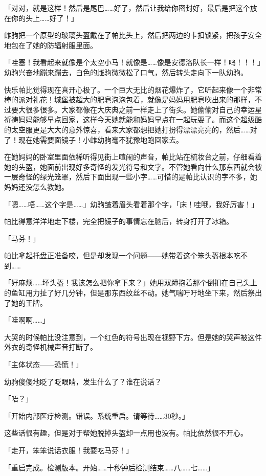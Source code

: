 「对对，就是这样！然后是尾巴……好了，然后让我给你密封好，最后是把这个放在你的头上……好了！」

雌驹把一个原型的玻璃头盔戴在了帕比头上，然后把两边的卡扣锁紧，把孩子安全地包在了她的防辐射服里面。

「哇塞！我看起来就像是个太空小马！就像是……像是安德洛队长一样！呜！！！」幼驹兴奋地蹦来蹦去，白色的雌驹微微松了口气，然后转头走向下一队幼驹。

快乐帕比觉得现在真开心极了。一个巨大无比的烟花爆炸了，它听起来像一个非常棒的派对礼花！城堡被超大的肥皂泡泡包着，就像是妈妈用肥皂吹出来的那样，不过要大很多很多。大家都像在大庆典之前一样走上了街头。她偷偷对自己的幸运星祈祷妈妈能够早点回家，这样今天她就能和妈妈早点在一起玩耍了。而这个超级酷的太空服更是大大的意外惊喜，看来大家都想把她打扮得漂漂亮亮的，然后……对了！现在她需要面镜子！小雌幼驹毫不犹豫地跑回家去。

\horizonline


在她妈妈的卧室里面依稀听得见街上喧闹的声音，帕比站在梳妆台之前，仔细看着她的头盔，她面前出现好多奇怪的发光符号和文字。不管她看向什么那东西就会被一层奇怪的绿光笼罩，然后下面出现一些小字……可惜的是帕比认识的字不多，她妈妈还没怎么教她。

「嗯……唔……这个字是……」幼驹皱着眉头看着那个字，「床！哇哦，我好厉害！」

帕比得意洋洋地走下楼，完全把镜子的事情忘在脑后，转身打开了冰箱。

「马芬！」

帕比拿起托盘正准备咬，但是却发现一个问题——她带着这个笨头盔根本吃不到……

「好麻烦……坏头盔！我该怎么把你拿下来？」她用双蹄抱着那个倒扣在自己头上的鱼缸用力扯了好几分钟，但是那东西纹丝不动。她气喘吁吁地坐下来，然后祭出了她的王牌。

「哇啊啊……」

大哭的时候帕比没注意到，一个红色的符号出现在视野下方。但是她的哭声被这件外衣的奇怪机械声音打断了。

「{\mt 主体状态——恐慌！}」

幼驹傻傻地眨了眨眼睛，发生什么了？谁在说话？

「唔？」

「{\mt 开始内部医疗检测。错误。系统重启。请等待……30秒。}」

这些话很有趣，但是对于帮她脱掉头盔却一点用也没有。帕比依然很不开心。

「走开，笨笨说话衣服！我要吃马芬！」

「{\mt 重启完成。检测版本。开始……十秒钟后检测结束……八……七……}」

